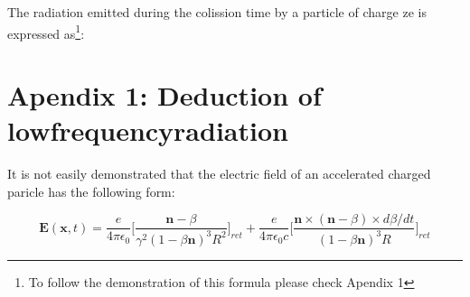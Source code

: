 \documentclass{article}
\begin{document}
The radiation emitted during the colission time by a particle of charge ze is expressed as\footnote{To follow the demonstration of this formula please check Apendix 1}:


\newpage

\section*{Apendix 1: Deduction of lowfrequencyradiation}

It is not easily demonstrated that the electric field of an accelerated charged paricle has the following form:

\begin{equation}
\label{Electricfieldacceleratedcharge}
\textbf{E}(\textbf{x},t)=\dfrac{e}{4\pi\epsilon_{0}} \bigg[\dfrac{\textbf{n}-\beta}{\gamma^{2}(1-\beta\textbf{n})^{3}R^{2}}\bigg]_{ret}+\dfrac{e}{4\pi\epsilon_{0}c}\bigg[\dfrac{\textbf{n}\times{(\textbf{n}-\beta)\times d\beta/dt}}{(1-\beta\textbf{n})^{3}R}\bigg]_{ret}
\end{equation} 
\end{document}
